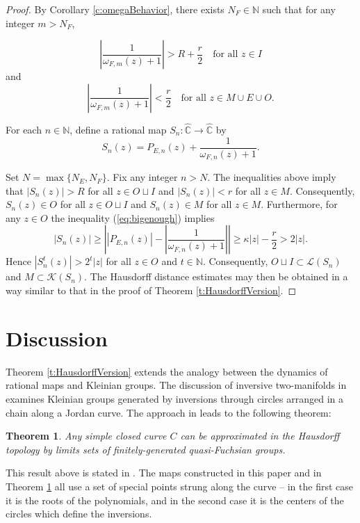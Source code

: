 \documentclass[a4paper,11pt,onecolumn]{amsart}
\newtheorem{theorem}{Theorem}[section]
\theoremstyle{definition}
\begin{document}
\begin{proof}
By Corollary \ref{c:omegaBehavior}, there exists $N_F \in \mathbb{N}$ such that for any integer $m>N_F$, 

$$\left| \frac{1}{\omega_{F,m}(z)+1} \right| > R + \frac{r}{2} \ \ \ \textrm{   for all } z \in I$$ 
and
 $$\left| \frac{1}{\omega_{F,m}(z)+1} \right| < \frac{r}{2} \ \ \ \textrm{ for all } z \in M \cup E \cup O.$$

For each $n \in \mathbb{N}$, define a rational map $S_n:\hat{\mathbb{C}} \rightarrow \hat{\mathbb{C}}$ by $$S_n(z) = P_{E,n}(z) + \frac{1}{\omega_{F,n}(z) + 1} .$$

Set $N = \max\{N_E, N_F\}$.  Fix any integer  $n > N$. The inequalities above imply that $|S_n(z)| >R$ for all $z \in O \sqcup I$ and $|S_n(z)| < r$ for all $z \in M$.   Consequently, $S_n(z) \in O$ for all $z \in O \sqcup I$ and $S_n(z) \in M$ for all $z \in M$.  Furthermore, for any $z \in O$ the inequality (\ref{eq:bigenough}) implies 
$$|S_n(z)| \geq \left| |P_{E,n}(z)| - |\frac{1}{\omega_{F,n}(z)+1}| \right|  \geq \kappa |z| - \frac{r}{2} > 2|z|.$$  Hence $|S_n^t(z)| > 2^t|z|$ for all $z \in O$ and $t \in \mathbb{N}$.  
Consequently, $O \sqcup I \subset \mathcal{L}(S_n)$ and $M \subset \mathcal{K}(S_n)$.  The Hausdorff distance estimates may then be obtained in a way similar to that in the proof of Theorem \ref{t:HausdorffVersion}.

 
 
 
  \end{proof}
\section{Discussion}

 Theorem \ref{t:HausdorffVersion} extends the analogy between the dynamics of rational maps and Kleinian groups.   The discussion of inversive two-manifolds in \cite{SullivanThurston} examines Kleinian groups generated by inversions through circles arranged in a chain along a Jordan curve.  The approach in \cite{SullivanThurston} leads to the following theorem:
\begin{theorem}  \label{t:KleinianCase} Any simple closed curve $C$ can be approximated in the Hausdorff topology by limits sets of finitely-generated quasi-Fuchsian groups.
 \end{theorem}
This result above is stated in \cite{HubbardV2}.  The maps constructed in this paper and in Theorem \ref{t:KleinianCase} all use a set of special points strung along the curve -- in the first case it is the roots of the polynomials, and in the second case it is the centers of the circles which define the inversions.  
\end{document}
